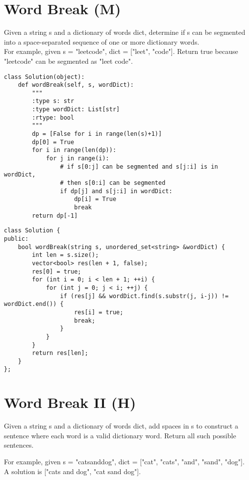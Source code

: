 \section{Word Break (M)}
Given a string s and a dictionary of words dict, determine if s can be segmented into a space-separated sequence of one or more dictionary words.\\

For example, given
s = "leetcode",
dict = ["leet", "code"].
Return true because "leetcode" can be segmented as "leet code". \\

\begin{lstlisting}
class Solution(object):
    def wordBreak(self, s, wordDict):
        """
        :type s: str
        :type wordDict: List[str]
        :rtype: bool
        """
        dp = [False for i in range(len(s)+1)]
        dp[0] = True
        for i in range(len(dp)):
            for j in range(i):
                # if s[0:j] can be segmented and s[j:i] is in wordDict,
                # then s[0:i] can be segmented
                if dp[j] and s[j:i] in wordDict:
                    dp[i] = True
                    break
        return dp[-1]
\end{lstlisting}

\begin{lstlisting}
class Solution {
public:
    bool wordBreak(string s, unordered_set<string> &wordDict) {
        int len = s.size();
        vector<bool> res(len + 1, false);
        res[0] = true;
        for (int i = 0; i < len + 1; ++i) {
            for (int j = 0; j < i; ++j) {
                if (res[j] && wordDict.find(s.substr(j, i-j)) != wordDict.end()) {
                    res[i] = true;
                    break;
                }
            }
        }
        return res[len];
    }
};
\end{lstlisting}


\section{Word Break II (H)}
Given a string s and a dictionary of words dict, add spaces in s to construct a sentence where each word is a valid dictionary word. Return all such possible sentences.

For example, given
s = "catsanddog",
dict = ["cat", "cats", "and", "sand", "dog"].
A solution is ["cats and dog", "cat sand dog"]. \\

